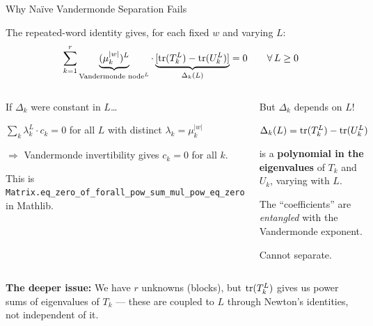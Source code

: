 \documentclass[aspectratio=169,10pt]{beamer}
\begin{document}
\begin{frame}{Why Na\"ive Vandermonde Separation Fails}
\vspace{-0.5em}

The repeated-word identity gives, for each fixed $w$ and varying $L$:
\[
  \sum_{k=1}^r \underbrace{(\mu_k^{|w|})^L}_{\text{Vandermonde node}^L}
  \cdot
  \underbrace{[\mathrm{tr}(T_k^L) - \mathrm{tr}(U_k^L)]}_{\Delta_k(L)}
  = 0
  \qquad \forall\, L \ge 0
\]

\vspace{0.3em}
\begin{columns}[T]
\begin{block}{\small If $\Delta_k$ were constant in $L$\ldots}
{\small
$\sum_k \lambda_k^L \cdot c_k = 0$ for all $L$
with distinct $\lambda_k = \mu_k^{|w|}$

$\Longrightarrow$ Vandermonde invertibility gives $c_k = 0$ for all $k$.

\textcolor{leangreen}{This is \texttt{Matrix.eq\_zero\_of\_forall\_pow\_sum\_mul\_pow\_eq\_zero} in Mathlib.}
}
\end{block}

\begin{block}{\small But $\Delta_k$ depends on $L$!}
{\small
$\Delta_k(L) = \mathrm{tr}(T_k^L) - \mathrm{tr}(U_k^L)$

is a \textbf{polynomial in the eigenvalues} of $T_k$ and $U_k$, varying with $L$.

The ``coefficients'' are \emph{entangled} with the Vandermonde exponent.

\textcolor{softred}{Cannot separate.}
}
\end{block}
\end{columns}

\vspace{0.5em}
\textcolor{amber}{\textbf{The deeper issue:}} We have $r$ unknowns (blocks), but
$\mathrm{tr}(T_k^L)$ gives us power sums of eigenvalues of $T_k$ --- these are coupled
to $L$ through Newton's identities, not independent of it.
\end{frame}
\end{document}

